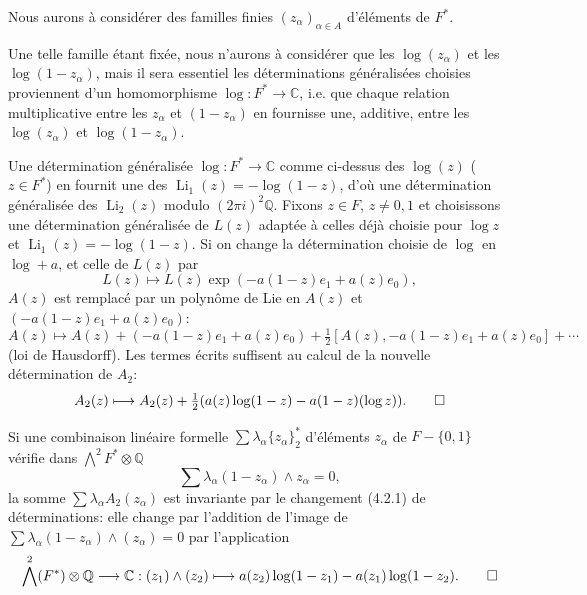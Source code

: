 \documentclass[12pt,a4paper]{article}
\theoremstyle{plain}
\theoremstyle{definition}
\theoremstyle{remark}
\newcommand{\Q}{\mathbb{Q}}
\newcommand{\C}{\mathbb{C}}
\begin{document}
Nous aurons {\`a} consid\'erer des familles finies $(z_\alpha)_{\alpha\in A}$ d'\'el\'ements de $F^*$.

Une telle famille \'etant fix\'ee, nous n'aurons {\`a} consid\'erer que les $\log(z_\alpha)$ et les $\log(1-z_\alpha)$, mais il sera essentiel les d\'eterminations g\'en\'eralis\'ees choisies proviennent d'un homomorphisme $\log:F^*\to\C$, i.e. que chaque relation multiplicative entre les $z_\alpha$ et $(1-z_\alpha)$ en fournisse une, additive, entre les $\log(z_\alpha)$ et $\log(1-z_\alpha)$.

Une d\'etermination g\'en\'eralis\'ee $\log:F^*\to\C$ comme ci-dessus des $\log(z)$ ($z\in F^*$) en fournit une des $\operatorname{Li}_1(z)=-\log(1-z)$, d'o\`u une d\'etermination g\'en\'eralis\'ee des $\operatorname{Li}_2(z)$ modulo $(2\pi i)^2\Q$. Fixons $z\in F$, $z\neq 0,1$ et choisissons une d\'etermination g\'en\'eralis\'ee de $L(z)$ adapt\'ee {\`a} celles d\'ej\`a choisie pour $\log z$ et $\operatorname{Li}_1(z)=-\log(1-z)$. Si on change la d\'etermination choisie de $\log$ en $\log+a$, et celle de $L(z)$ par
\begin{equation}\label{eq:4.2.1}
L(z) \longmapsto L(z)\exp(-a(1-z)e_1+a(z)e_0),\tag{4.2.1}
\end{equation}
$A(z)$ est remplac\'e par un polyn\^ome de Lie en $A(z)$ et $(-a(1-z)e_1+a(z)e_0)$:
\begin{equation}\label{eq:4.2.2}
A(z) \longmapsto A(z) + (-a(1-z)e_1+a(z)e_0) + \tfrac{1}{2}[A(z),-a(1-z)e_1+a(z)e_0]+\cdots
\tag{4.2.2}
\end{equation}
(loi de Hausdorff). Les termes \'ecrits suffisent au calcul de la nouvelle d\'etermination de $A_2$:
\begin{equation*}
A_2(z) \longmapsto A_2(z) + \tfrac{1}{2}(a(z)\log(1-z)-a(1-z)(\log z)).\qedhere
\end{equation*}

Si une combinaison lin\'eaire formelle $\sum\lambda_\alpha\{z_\alpha\}_2^*$ d'\'el\'ements $z_\alpha$ de $F-\{0,1\}$ v\'erifie dans $\bigwedge^2 F^*\otimes\Q$
\begin{equation}\label{eq:4.2.3}
\sum\lambda_\alpha(1-z_\alpha)\wedge z_\alpha = 0,\tag{4.2.3}
\end{equation}
la somme $\sum\lambda_\alpha A_2(z_\alpha)$ est invariante par le changement (4.2.1) de d\'eterminations: elle change par l'addition de l'image de $\sum\lambda_\alpha(1-z_\alpha)\wedge(z_\alpha)=0$ par l'application
\begin{equation*}
\bigwedge^2(F^*)\otimes\Q \longrightarrow \C: (z_1)\wedge(z_2) \longmapsto a(z_2)\log(1-z_1)-a(z_1)\log(1-z_2).\qedhere
\end{equation*}
\end{document}
